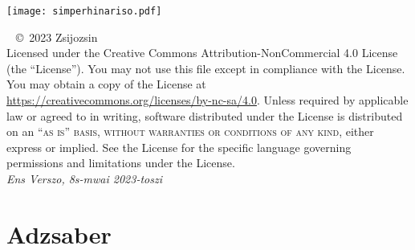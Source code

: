 \documentclass[12pt, a4paper]{legportokali}
\begin{document}

\onehalfspacing

\titlepage
{\texttt{[image: simperhinariso.pdf]}}

\thispagestyle{empty}
~\vfill
{
	\noindent \copyright\ 2023 Zsijozsin \\
	Licensed under the Creative Commons Attribution-NonCommercial 4.0 License (the ``License'').
	You may not use this file except in compliance with the License. You may obtain a copy of the
	License at \url{https://creativecommons.org/licenses/by-nc-sa/4.0}. Unless required by applicable
	law or agreed to in writing, software distributed under the License is distributed on an
	\textsc{``as is'' basis, without warranties or conditions of any kind}, either express or implied.
	See the License for the specific language governing permissions and limitations under the License. \\
	\textit{Ens Verszo, 8s-mwai 2023-toszi}
}

\pagestyle{empty}
\tableofcontents
\listoffigures
\listoftables

\pagestyle{fancy}
\cleardoublepage



\part{Adzsaber}

\end{document}
